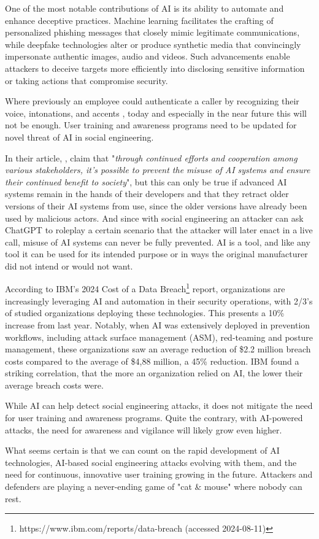 One of the most notable contributions of AI is its ability to automate and enhance deceptive practices. Machine learning facilitates the crafting of personalized phishing messages that closely mimic legitimate communications, while deepfake technologies alter or produce synthetic media that convincingly impersonate authentic images, audio and videos. Such advancements enable attackers to deceive targets more efficiently into disclosing sensitive information or taking actions that compromise security.

Where previously an employee could authenticate a caller by recognizing their voice, intonations, and accents \citep{mitnickArtDeceptionControlling2003}, today and especially in the near future this will not be enough. User training and awareness programs need to be updated for novel threat of AI in social engineering.

In their article, \cite{guptaFromChatGPTtoThreatGPT2023}, claim that "\textit{through continued efforts and cooperation among various stakeholders, it’s possible to prevent the misuse of AI systems and ensure their continued benefit to society}", but this can only be true if advanced AI systems remain in the hands of their developers and that they retract older versions of their AI systems from use, since the older versions have already been used by malicious actors. And since with social engineering an attacker can ask ChatGPT to roleplay a certain scenario that the attacker will later enact in a live call, misuse of AI systems can never be fully prevented. AI is a tool, and like any tool it can be used for its intended purpose or in ways the original manufacturer did not intend or would not want.

According to IBM's 2024 Cost of a Data Breach\footnote{https://www.ibm.com/reports/data-breach (accessed 2024-08-11)} report, organizations are increasingly leveraging AI and automation in their security operations, with 2/3's of studied organizations deploying these technologies. This presents a 10\% increase from last year. Notably, when AI was extensively deployed in prevention workflows, including attack surface management (ASM), red-teaming and posture management, these organizations saw an average reduction of \$2.2 million breach costs compared to the average of \$4,88 million, a 45\% reduction. IBM found a striking correlation, that the more an organization relied on AI, the lower their average breach costs were.

While AI can help detect social engineering attacks, it does not mitigate the need for user training and awareness programs. Quite the contrary, with AI-powered attacks, the need for awareness and vigilance will likely grow even higher.

What seems certain is that we can count on the rapid development of AI technologies, AI-based social engineering attacks evolving with them, and the need for continuous, innovative user training growing in the future. Attackers and defenders are playing a never-ending game of "cat \& mouse" where nobody can rest.